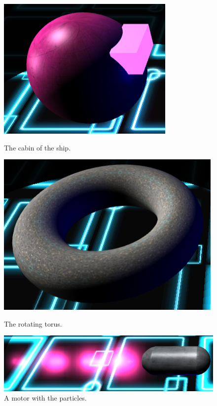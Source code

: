 \documentclass[11pt]{article}
\begin{document}
	\begin{figure}[!htb]
		\centering
		\begin{minipage}[b]{0.25\linewidth}
			\includegraphics[width=\linewidth]{cabin}
			\caption{The cabin of the ship.}
			\label{fig:cabin}
		\end{minipage}
		\begin{minipage}[b]{0.276\linewidth}
			\includegraphics[width=\linewidth]{toro}
			\caption{The rotating torus.}
			\label{fig:toro}
		\end{minipage}
		\begin{minipage}[b]{0.6\linewidth}
			\includegraphics[width=\linewidth]{motor}
			\caption{A motor with the particles.}
			\label{fig:motor}
		\end{minipage}
	\end{figure}
\end{document}
